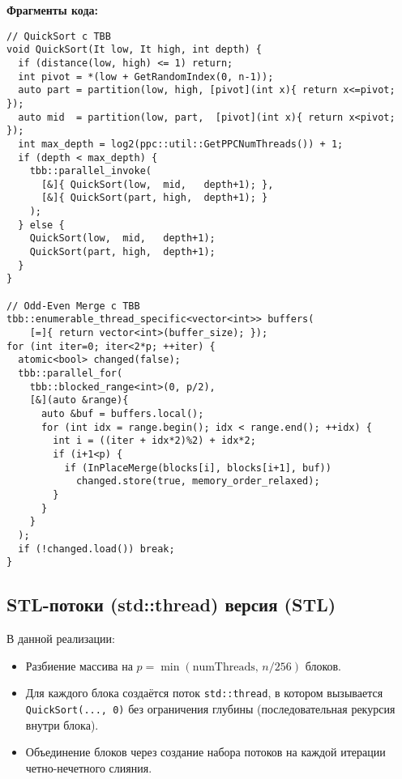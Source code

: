 \documentclass[12pt]{article}
\begin{document}
\noindent\textbf{Фрагменты кода:}
\lstset{language=C++}
\begin{lstlisting}
// QuickSort с TBB
void QuickSort(It low, It high, int depth) {
  if (distance(low, high) <= 1) return;
  int pivot = *(low + GetRandomIndex(0, n-1));
  auto part = partition(low, high, [pivot](int x){ return x<=pivot; });
  auto mid  = partition(low, part,  [pivot](int x){ return x<pivot; });
  int max_depth = log2(ppc::util::GetPPCNumThreads()) + 1;
  if (depth < max_depth) {
    tbb::parallel_invoke(
      [&]{ QuickSort(low,  mid,   depth+1); },
      [&]{ QuickSort(part, high,  depth+1); }
    );
  } else {
    QuickSort(low,  mid,   depth+1);
    QuickSort(part, high,  depth+1);
  }
}

// Odd-Even Merge с TBB
tbb::enumerable_thread_specific<vector<int>> buffers(
    [=]{ return vector<int>(buffer_size); });
for (int iter=0; iter<2*p; ++iter) {
  atomic<bool> changed(false);
  tbb::parallel_for(
    tbb::blocked_range<int>(0, p/2),
    [&](auto &range){
      auto &buf = buffers.local();
      for (int idx = range.begin(); idx < range.end(); ++idx) {
        int i = ((iter + idx*2)%2) + idx*2;
        if (i+1<p) {
          if (InPlaceMerge(blocks[i], blocks[i+1], buf))
            changed.store(true, memory_order_relaxed);
        }
      }
    }
  );
  if (!changed.load()) break;
}
\end{lstlisting}

\subsection{STL-потоки (std::thread) версия (STL)}
\hspace*{1.25em}В данной реализации:
\begin{itemize}
    \item Разбиение массива на $p = \min(\text{numThreads},\, n/256)$ блоков.
    \item Для каждого блока создаётся поток \texttt{std::thread}, в котором вызывается \texttt{QuickSort(..., 0)} без ограничения глубины (последовательная рекурсия внутри блока).
    \item Объединение блоков через создание набора потоков на каждой итерации четно-нечетного слияния.
\end{itemize}
\end{document}
